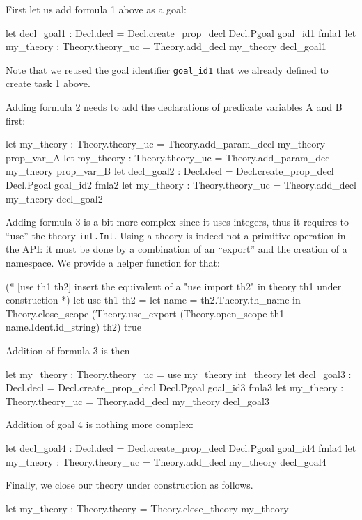 First let us add formula 1 above as a goal:
\begin{ocamlcode}
let decl_goal1 : Decl.decl =
  Decl.create_prop_decl Decl.Pgoal goal_id1 fmla1
let my_theory : Theory.theory_uc =
  Theory.add_decl my_theory decl_goal1
\end{ocamlcode}
Note that we reused the goal identifier \verb|goal_id1| that we
already defined to create task 1 above.

Adding formula 2 needs to add the declarations of predicate variables A
and B first:
\begin{ocamlcode}
let my_theory : Theory.theory_uc =
  Theory.add_param_decl my_theory prop_var_A
let my_theory : Theory.theory_uc =
  Theory.add_param_decl my_theory prop_var_B
let decl_goal2 : Decl.decl =
  Decl.create_prop_decl Decl.Pgoal goal_id2 fmla2
let my_theory : Theory.theory_uc = Theory.add_decl my_theory decl_goal2
\end{ocamlcode}

Adding formula 3 is a bit more complex since it uses integers, thus it
requires to ``use'' the theory \verb|int.Int|. Using a theory is
indeed not a primitive operation in the API: it must be done by a
combination of an ``export'' and the creation of a namespace. We
provide a helper function for that:
\begin{ocamlcode}
(* [use th1 th2] insert the equivalent of a "use import th2" in
   theory th1 under construction *)
let use th1 th2 =
  let name = th2.Theory.th_name in
  Theory.close_scope
    (Theory.use_export
      (Theory.open_scope th1 name.Ident.id_string) th2) true
\end{ocamlcode}
Addition of formula 3 is then
\begin{ocamlcode}
let my_theory : Theory.theory_uc = use my_theory int_theory
let decl_goal3 : Decl.decl =
  Decl.create_prop_decl Decl.Pgoal goal_id3 fmla3
let my_theory : Theory.theory_uc =
  Theory.add_decl my_theory decl_goal3
\end{ocamlcode}

Addition of goal 4 is nothing more complex:
\begin{ocamlcode}
let decl_goal4 : Decl.decl =
  Decl.create_prop_decl Decl.Pgoal goal_id4 fmla4
let my_theory :
  Theory.theory_uc = Theory.add_decl my_theory decl_goal4
\end{ocamlcode}

Finally, we close our theory under construction as follows.
\begin{ocamlcode}
let my_theory : Theory.theory = Theory.close_theory my_theory
\end{ocamlcode}

